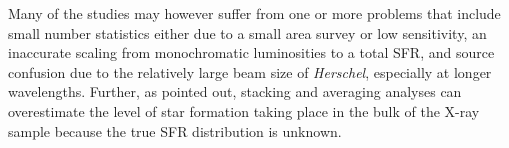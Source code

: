 \documentclass[fleqn, usenatbib]{mnras}
\newcommand{\herschel}{\emph{Herschel}}
\begin{document}

Many of the studies may however suffer from one or more problems that include small number statistics either due to a small area survey or low sensitivity, an inaccurate scaling from monochromatic luminosities to a total SFR, and source confusion due to the relatively large beam size of \herschel, especially at longer wavelengths. Further, as \citet{Barger:2015ly} pointed out, stacking and averaging analyses can overestimate the level of star formation taking place in the bulk of the X-ray sample because the true SFR distribution is unknown. 


\end{document}
